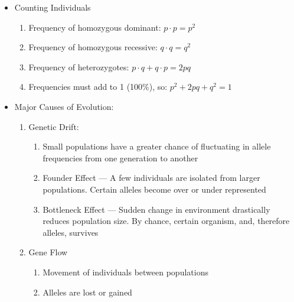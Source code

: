 \documentclass[12pt]{article}
\begin{document}
\begin{itemize}
\begin{enumerate}
    \end{enumerate}

  \item Counting Individuals

    \begin{enumerate}

      \item Frequency of homozygous dominant: $p\cdot p= p^2$

      \item Frequency of homozygous recessive: $q\cdot q= q^2$

      \item Frequency of heterozygotes: $p\cdot q + q\cdot p = 2pq$

      \item Frequencies must add to 1 (100\%), so: $p^2 + 2pq+q^2 =1$

    \end{enumerate}

  \item Major Causes of Evolution:

    \begin{enumerate}

      \item Genetic Drift:

        \begin{enumerate}

          \item Small populations have a greater chance of fluctuating in allele frequencies from one generation to another

          \item Founder Effect — A few individuals are isolated from larger populations. Certain alleles become over or under represented
            
          \item Bottleneck Effect — Sudden change in environment drastically reduces population size. By chance, certain organism, and, therefore alleles, survives

        \end{enumerate}

      \item Gene Flow

        \begin{enumerate}

          \item Movement of individuals between populations

          \item Alleles are lost or gained


\end{enumerate}
\end{enumerate}
\end{itemize}
\end{document}

